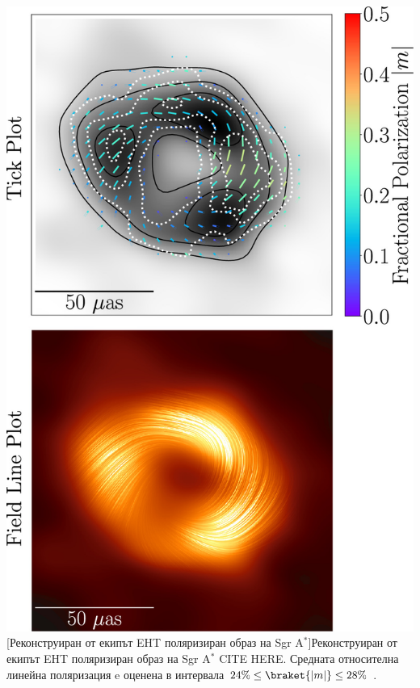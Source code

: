 \begin{minipage}{14em}
	\centering
	\includegraphics[scale = 0.6]{Sgr_A_Polarization_overlay.jpg}
	[Реконструиран от екипът EHT поляризиран образ на Sgr A$^*$]{\small Реконструиран от екипът EHT поляризиран образ на Sgr A$^*$ CITE HERE. Средната относителна линейна поляризация e оценена в интервала $24\% \le \braket{|m|} \le 28\%$ \cite{EHT_SGR_VII}.}
	\label{SgrA_Pol_Image}
\end{minipage}\\

